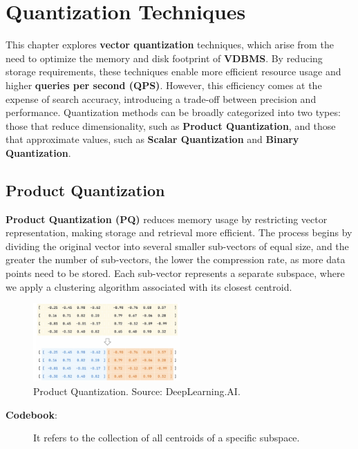 \pagestyle{fancy}
\chapter{Quantization Techniques}
\label{chap:Vector quantization in VBDMS}
This chapter explores \textbf{vector quantization} techniques, which arise from the need to optimize the memory and disk footprint of \textbf{VDBMS}. By reducing storage requirements, these techniques enable more efficient resource usage and higher \textbf{queries per second (QPS)}. However, this efficiency comes at the expense of search accuracy, introducing a trade-off between precision and performance. Quantization methods can be broadly categorized into two types: those that reduce dimensionality, such as \textbf{Product Quantization}, and those that approximate values, such as \textbf{Scalar Quantization} and \textbf{Binary Quantization}.

\section{Product Quantization}
\textbf{Product Quantization (PQ)} reduces memory usage by restricting vector representation, making storage and retrieval more efficient. The process begins by dividing the original vector into several smaller sub-vectors of equal size, and the greater the number of sub-vectors, the lower the compression rate, as more data points need to be stored. Each sub-vector represents a separate subspace, where we apply a clustering algorithm associated with its closest centroid.
\begin{figure}[h]
    \centering
    \includegraphics[width=0.5\textwidth]{IMAGES/immagine_2025-02-27_122846884.png}
    \caption{Product Quantization. Source: DeepLearning.AI.\footnotemark[1]}
    \label{fig:PQ}
\end{figure}

\begin{description}
\item[\textbf{Codebook}:] It refers to the collection of all centroids of a specific subspace.
\end{description}

